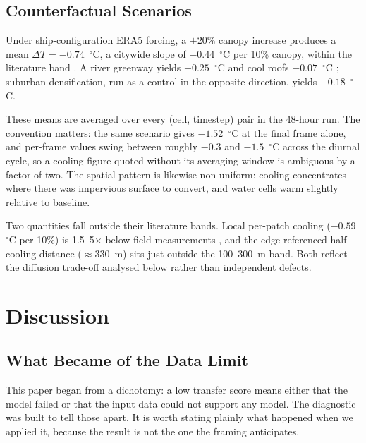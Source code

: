 \documentclass[remotesensing,article,submit,oneauthor]{Definitions/mdpi}
\begin{document}
\subsection{Counterfactual Scenarios}

Under ship-configuration ERA5 forcing, a $+20\%$ canopy increase produces
a mean $\Delta T = -0.74$~$^{\circ}$C, a citywide slope of
$-0.44$~$^{\circ}$C per 10\% canopy, within the literature band
\cite{zhou2025tree,wri2026cooling}. A river greenway yields
$-0.25$~$^{\circ}$C and cool roofs $-0.07$~$^{\circ}$C
\cite{santamouris2014cool,wang2022berlin}; suburban densification, run as
a control in the opposite direction, yields $+0.18$~$^{\circ}$C.

These means are averaged over every (cell, timestep) pair in the 48-hour
run. The convention matters: the same scenario gives
$-1.52$~$^{\circ}$C at the final frame alone, and per-frame values swing
between roughly $-0.3$ and $-1.5$~$^{\circ}$C across the diurnal cycle,
so a cooling figure quoted without its averaging window is ambiguous by a
factor of two. The spatial pattern is likewise non-uniform: cooling
concentrates where there was impervious surface to convert, and water
cells warm slightly relative to baseline.

Two quantities fall outside their literature bands. Local per-patch
cooling ($-0.59$~$^{\circ}$C per 10\%) is 1.5--5$\times$ below field
measurements \cite{krayenhoff2021albedo}, and the edge-referenced
half-cooling distance ($\approx$330~m) sits just outside the 100--300~m
band. Both reflect the diffusion trade-off analysed below rather than
independent defects.

\section{Discussion}
\label{sec:disc}

\subsection{What Became of the Data Limit}
\label{sec:dichotomy}

This paper began from a dichotomy: a low transfer score means either that
the model failed or that the input data could not support any model. The
diagnostic was built to tell those apart. It is worth stating plainly what
happened when we applied it, because the result is not the one the framing
anticipates.
\end{document}
